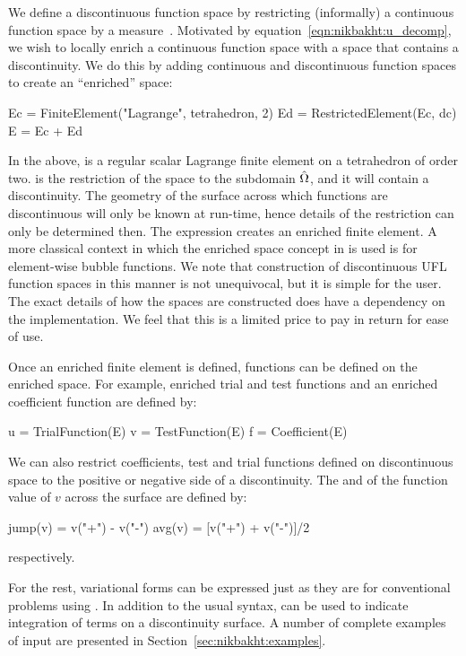 We define a discontinuous function space by restricting (informally)
a continuous function space by a measure~. Motivated by
equation~\eqref{eqn:nikbakht:u_decomp}, we wish to locally enrich a
continuous function space with a space that contains a discontinuity. We
do this by adding continuous and discontinuous function spaces to create
an ``enriched'' space:
%
\begin{python}
Ec = FiniteElement("Lagrange", tetrahedron, 2)
Ed = RestrictedElement(Ec, dc)
E  = Ec + Ed
\end{python}
%
In the above,  is a regular scalar Lagrange finite element
on a tetrahedron of order two.  is the restriction of the
space  to the subdomain $\Hat{\Omega}$, and it will contain
a discontinuity. The geometry of the surface across which functions
are discontinuous will only be known at run-time, hence details of the
restriction can only be determined then. The expression  creates an enriched finite element. A more classical context in
which the enriched space concept in \ufl{} is used is for element-wise
bubble functions.  We note that construction of discontinuous UFL function
spaces in this manner is not unequivocal, but it is simple for the user.
The exact details of how the spaces are constructed does have a dependency
on the implementation. We feel that this is a limited price to pay in
return for ease of use.

Once an enriched finite element is defined, functions can be defined on
the enriched space. For example, enriched trial and test functions and
an enriched coefficient function are defined by:
%
\begin{python}
u = TrialFunction(E)
v = TestFunction(E)
f = Coefficient(E)
\end{python}
%
We can also restrict coefficients, test and trial functions
defined on discontinuous space to the positive or negative side of a
discontinuity. The  and  of the function value
of $v$ across the surface are defined by:
%
\begin{python}
jump(v) = v("+") - v("-")
avg(v)  = [v("+") + v("-")]/2
\end{python}
%
respectively.

For the rest, variational forms can be expressed just as they are for
conventional problems using \ufl{}. In addition to the usual \ufl{}
syntax,  can be used to indicate integration of terms on a
discontinuity surface.  A number of complete examples of \ufl{} input
are presented in Section~\ref{sec:nikbakht:examples}.
